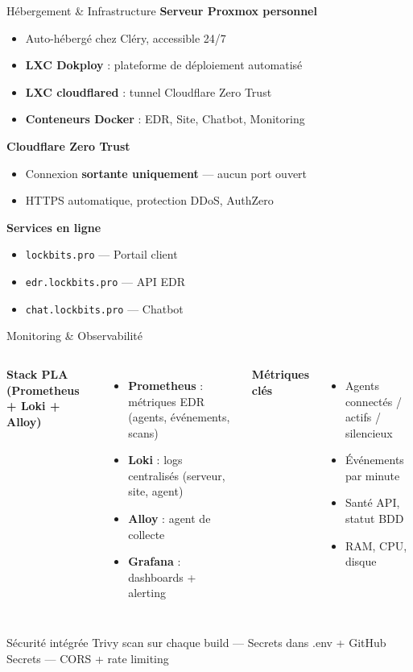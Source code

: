 \documentclass[xcolor=dvipsnames, aspectratio=169, 10pt]{beamer}
\newcommand{\bitem}{\item[$\bullet$]}
\begin{document}
\begin{frame}{Hébergement \& Infrastructure}
  \textbf{Serveur Proxmox personnel}
  \begin{itemize}
    \bitem Auto-hébergé chez Cléry, accessible 24/7
    \bitem \textbf{LXC Dokploy} : plateforme de déploiement automatisé
    \bitem \textbf{LXC cloudflared} : tunnel Cloudflare Zero Trust
    \bitem \textbf{Conteneurs Docker} : EDR, Site, Chatbot, Monitoring
  \end{itemize}
  \vspace{0.2cm}
  \textbf{Cloudflare Zero Trust}
  \begin{itemize}
    \bitem Connexion \textbf{sortante uniquement} — aucun port ouvert
    \bitem HTTPS automatique, protection DDoS, AuthZero
  \end{itemize}
  \vspace{0.2cm}
  \textbf{Services en ligne}
  \begin{itemize}
    \bitem \texttt{lockbits.pro} — Portail client
    \bitem \texttt{edr.lockbits.pro} — API EDR
    \bitem \texttt{chat.lockbits.pro} — Chatbot
  \end{itemize}
\end{frame}

\begin{frame}{Monitoring \& Observabilité}
  \begin{columns}[t]
    \textbf{Stack PLA (Prometheus + Loki + Alloy)}
    \begin{itemize}
      \bitem \textbf{Prometheus} : métriques EDR (agents, événements, scans)
      \bitem \textbf{Loki} : logs centralisés (serveur, site, agent)
      \bitem \textbf{Alloy} : agent de collecte
      \bitem \textbf{Grafana} : dashboards + alerting
    \end{itemize}
    \textbf{Métriques clés}
    \begin{itemize}
      \bitem Agents connectés / actifs / silencieux
      \bitem Événements par minute
      \bitem Santé API, statut BDD
      \bitem RAM, CPU, disque
    \end{itemize}
  \end{columns}
  \vspace{0.3cm}
  \begin{alertblock}{Sécurité intégrée}
    Trivy scan sur chaque build — Secrets dans .env + GitHub Secrets — CORS + rate limiting
  \end{alertblock}
\end{frame}
\end{document}
